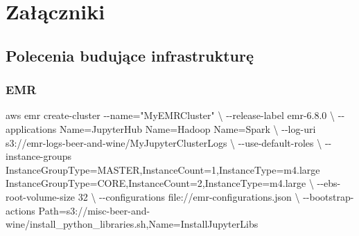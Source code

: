 \documentclass[
  letterpaper,
  DIV=11,
  numbers=noendperiod]{scrreprt}
\newenvironment{Shaded}{\begin{snugshade}}{\end{snugshade}}
\newcommand{\AttributeTok}[1]{\textcolor[rgb]{0.40,0.45,0.13}{#1}}
\newcommand{\DataTypeTok}[1]{\textcolor[rgb]{0.68,0.00,0.00}{#1}}
\newcommand{\ExtensionTok}[1]{\textcolor[rgb]{0.00,0.23,0.31}{#1}}
\newcommand{\NormalTok}[1]{\textcolor[rgb]{0.00,0.23,0.31}{#1}}
\newcommand{\OperatorTok}[1]{\textcolor[rgb]{0.37,0.37,0.37}{#1}}
\newcommand{\StringTok}[1]{\textcolor[rgb]{0.13,0.47,0.30}{#1}}
\newlength{\cslhangindent}
\newlength{\cslentryspacingunit} %
\newenvironment{CSLReferences}[2] %
 {%
  \setlength{\parindent}{0pt}
  \ifodd #1
  \let\oldpar\par
  \def\par{\hangindent=\cslhangindent\oldpar}
  \fi
  \setlength{\parskip}{#2\cslentryspacingunit}
 }%
 {}
\begin{document}
\hypertarget{refs}{}
\begin{CSLReferences}{0}{0}
\end{CSLReferences}


\hypertarget{sec-appendix}{%
\chapter{Załączniki}\label{sec-appendix}}

\hypertarget{polecenia-budujux105ce-infrastrukturux119}{%
\section{Polecenia budujące
infrastrukturę}\label{polecenia-budujux105ce-infrastrukturux119}}

\hypertarget{sec-emr}{%
\subsection{EMR}\label{sec-emr}}

\small

\begin{Shaded}
\begin{Highlighting}[]
\ExtensionTok{aws}\NormalTok{ emr create{-}cluster }\AttributeTok{{-}{-}name}\OperatorTok{=}\StringTok{"MyEMRCluster"} \DataTypeTok{\textbackslash{}}
    \AttributeTok{{-}{-}release{-}label}\NormalTok{ emr{-}6.8.0 }\DataTypeTok{\textbackslash{}}
    \AttributeTok{{-}{-}applications}\NormalTok{ Name=JupyterHub Name=Hadoop Name=Spark }\DataTypeTok{\textbackslash{}}
    \AttributeTok{{-}{-}log{-}uri}\NormalTok{ s3://emr{-}logs{-}beer{-}and{-}wine/MyJupyterClusterLogs }\DataTypeTok{\textbackslash{}}
    \AttributeTok{{-}{-}use{-}default{-}roles} \DataTypeTok{\textbackslash{}}
    \AttributeTok{{-}{-}instance{-}groups}\NormalTok{ InstanceGroupType=MASTER,InstanceCount=1,InstanceType=m4.large InstanceGroupType=CORE,InstanceCount=2,InstanceType=m4.large }\DataTypeTok{\textbackslash{}}
    \AttributeTok{{-}{-}ebs{-}root{-}volume{-}size}\NormalTok{ 32 }\DataTypeTok{\textbackslash{}}
    \AttributeTok{{-}{-}configurations}\NormalTok{ file://emr{-}configurations.json }\DataTypeTok{\textbackslash{}}
    \AttributeTok{{-}{-}bootstrap{-}actions}\NormalTok{ Path=s3://misc{-}beer{-}and{-}wine/install\_python\_libraries.sh,Name=InstallJupyterLibs}
\end{Highlighting}
\end{Shaded}
\end{document}

